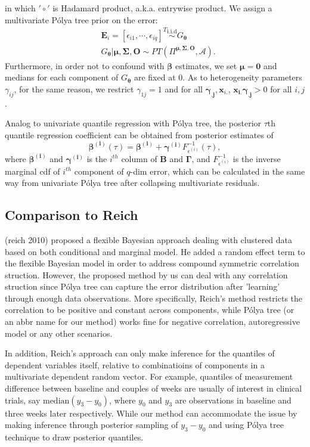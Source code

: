 \documentclass{article}
\newcommand{\polya}{P\'{o}lya}
\begin{document}
in which $'\circ'$ is Hadamard product, a.k.a. entrywise product. We
assign a multivariate \polya{} tree prior on the error:
\begin{align*}
&\bm{E}_i = [\epsilon_{i1}, \cdots, \epsilon_{iq}]^T
  \stackrel{\text{i.i.d}}{\sim} G_{\bm{\theta}} \\
&G_{\bm{\theta}} | \bm{\mu, \Sigma, O}  \sim PT \left( \Pi^{\bm{\mu,
      \Sigma, O}}, \mathcal{A} \right).
\end{align*}
Furthermore, in order not to confound with $\bm{\beta}$ estimates, we
set $\bm{\mu} = \bm{0}$ and medians for each component of
$G_{\bm{\theta}}$ are fixed at 0. As to heterogeneity parameters
$\gamma_{ij}$, for the same reason, we restrict $\gamma_{1j}=1$ and
for all $\bm{\gamma_{.j}}, \bm{x}_{i.}$, $\bm{x_{i.}\gamma_{.j}}>0$
for all $i,j$. 

Analog to univariate quantile regression with \polya{} tree, the
posterior $\tau$th quantile regression coefficient can be obtained
from posterior estimates of 
\begin{equation}\label{eq:mul}
\bm{\beta^{(i)}}(\tau) = \bm{\beta^{(i)}} + \bm{\gamma^{(i)}}F^{-1}_{\epsilon^{(i)}}(\tau),
\end{equation}
where $\bm{\beta^{(i)}}$ and $\bm{\gamma^{(i)}}$ is the $i^{th}$
column of $\bm{B}$ and $\bm{\Gamma}$, and $F^{-1}_{\epsilon^{(i)}}$ is
the inverse marginal cdf of $i^{th}$ component of $q$-dim error, which
can be calculated in the same way from univariate \polya{} tree after
collapsing multivariate residuals. 

\subsection{Comparison to Reich}
(reich 2010) proposed a flexible Bayesian approach dealing with
clustered data based on both conditional and marginal model. He added
a random effect term to the flexible Bayesian model in order to
address compound symmetric correlation struction. However, the
proposed method by us can deal with any correlation struction since
\polya{} tree can capture the error distribution after 'learning'
through enough data observations. More specifically, Reich's method
restricts the correlation to be positive and constant across
components, while \polya{} tree (or an abbr name for our method) works
fine for negative correlation, autoregressive model or any other
scenarios. 

In addition, Reich's approach can only make inference for the
quantiles of dependent variables itself, relative to combinatioins of
components in a multivariate dependent random vector. For example,
quantiles of measurement difference between baseline and couples of
weeks are usually of interest in clinical trials, say
$\text{median}(y_3-y_0)$, where $y_0$ and $y_3$ are observations in
baseline and three weeks later respectively. While our method can
accommodate the issue by making inference through posterior sampling
of $y_3-y_0$ and using \polya{} tree technique to draw posterior
quantiles.  
\end{document}
